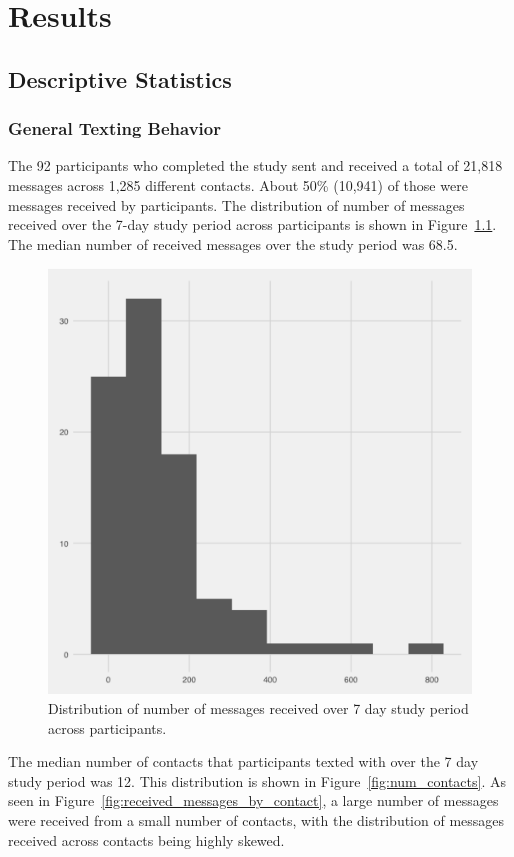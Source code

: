\documentclass[12pt]{nuthesis}	%
\begin{document}
\chapter{Results}

\section{Descriptive Statistics}

\subsection{General Texting Behavior}

The 92 participants who completed the study sent and received a total of 21,818 messages across 1,285 different contacts. About 50\% (10,941) of those were messages received by participants. The distribution of number of messages received over the 7-day study period across participants is shown in Figure~\ref{fig:received_messages}. The median number of received messages over the study period was 68.5. 

\begin{figure}[h]
\centering
\includegraphics[width=.7\textwidth]{figures/all_messages_received_distribution}
\caption{Distribution of number of messages received over 7 day study period across participants.}
\label{fig:received_messages}
\end{figure}

The median number of contacts that participants texted with over the 7 day study period was 12. This distribution is shown in Figure~\ref{fig:num_contacts}. As seen in Figure~\ref{fig:received_messages_by_contact}, a large number of messages were received from a small number of contacts, with the distribution of messages received across contacts being highly skewed.
\end{document}
